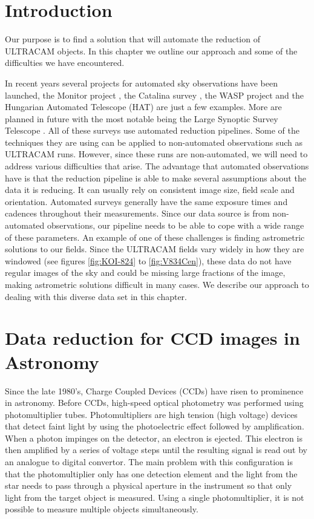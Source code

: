 \section{Introduction}
Our purpose is to find a solution that will automate the reduction of ULTRACAM objects. In this chapter we outline our approach and some of the difficulties we have encountered. 

In recent years several projects for automated sky observations have been launched, the Monitor project \citep{Irwin2007}, the Catalina survey \citep{CatalinaCatalog}, the WASP project \citep{PollaccoSuperWASP} and the Hungarian Automated Telescope (HAT) \citep{BakosHATNet} are just a few examples. More are planned in future with the most notable being the Large Synoptic Survey Telescope \citep{lsst}. All of these surveys use automated reduction pipelines. Some of the techniques they are using can be applied to non-automated observations such as ULTRACAM runs. However, since these runs are non-automated, we will need to address various difficulties that arise. The advantage that automated observations have is that the reduction pipeline is able to make several assumptions about the data it is reducing. It can usually rely on consistent image size, field scale and orientation. Automated surveys generally have the same exposure times and cadences throughout their measurements. Since our data source is from non-automated observations, our pipeline needs to be able to cope with a wide range of these parameters. An example of one of these challenges is finding astrometric solutions to our fields. Since the ULTRACAM fields vary widely in how they are windowed (see figures \ref{fig:KOI-824} to \ref{fig:V834Cen}), these data do not have regular images of the sky and could be missing large fractions of the image, making astrometric solutions difficult in many cases. We describe our approach to dealing with this diverse data set in this chapter. 

\section{Data reduction for CCD images in Astronomy}
Since the late 1980's, Charge Coupled Devices (CCDs) have risen to prominence in astronomy. Before CCDs, high-speed optical photometry was performed using photomultiplier tubes. Photomultipliers are high tension (high voltage) devices that detect faint light by using the photoelectric effect followed by amplification. When a photon impinges on the detector, an electron is ejected. This electron is then amplified by a series of voltage steps until the resulting signal is read out by an analogue to digital convertor. The main problem with this configuration is that the photomultiplier only has one detection element and the light from the star needs to pass through a physical aperture in the instrument so that only light from the target object is measured. Using a single photomultiplier, it is not possible to measure multiple objects simultaneously. 

